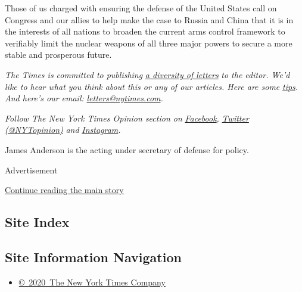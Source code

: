 Those of us charged with ensuring the defense of the United States call
on Congress and our allies to help make the case to Russia and China
that it is in the interests of all nations to broaden the current arms
control framework to verifiably limit the nuclear weapons of all three
major powers to secure a more stable and prosperous future.

\emph{The Times is committed to publishing}
\href{https://www.nytimes.com/2019/01/31/opinion/letters/letters-to-editor-new-york-times-women.html}{\emph{a
diversity of letters}} \emph{to the editor. We'd like to hear what you
think about this or any of our articles. Here are some}
\href{https://help.nytimes.com/hc/en-us/articles/115014925288-How-to-submit-a-letter-to-the-editor}{\emph{tips}}\emph{.
And here's our email:}
\href{mailto:letters@nytimes.com}{\emph{letters@nytimes.com}}\emph{.}

\emph{Follow The New York Times Opinion section on}
\href{https://www.facebook.com/nytopinion}{\emph{Facebook}}\emph{,}
\href{http://twitter.com/NYTOpinion}{\emph{Twitter (@NYTopinion)}}
\emph{and}
\href{https://www.instagram.com/nytopinion/}{\emph{Instagram}}\emph{.}

James Anderson is the acting under secretary of defense for policy.

Advertisement

\protect\hyperlink{after-bottom}{Continue reading the main story}

\hypertarget{site-index}{%
\subsection{Site Index}\label{site-index}}

\hypertarget{site-information-navigation}{%
\subsection{Site Information
Navigation}\label{site-information-navigation}}

\begin{itemize}
\tightlist
\item
  \href{https://help.nytimes.com/hc/en-us/articles/115014792127-Copyright-notice}{©~2020~The
  New York Times Company}
\end{itemize}

